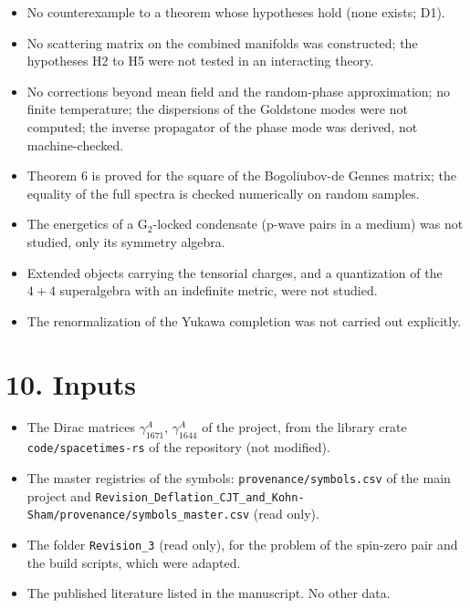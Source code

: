 \documentclass[
  10pt,
]{article}
\providecommand{\tightlist}{%
  \setlength{\itemsep}{0pt}\setlength{\parskip}{0pt}}
\begin{document}
\begin{itemize}
\tightlist
\item
  No counterexample to a theorem whose hypotheses hold (none exists;
  D1).
\item
  No scattering matrix on the combined manifolds was constructed; the
  hypotheses H2 to H5 were not tested in an interacting theory.
\item
  No corrections beyond mean field and the random-phase approximation;
  no finite temperature; the dispersions of the Goldstone modes were not
  computed; the inverse propagator of the phase mode was derived, not
  machine-checked.
\item
  Theorem 6 is proved for the square of the Bogoliubov-de Gennes matrix;
  the equality of the full spectra is checked numerically on random
  samples.
\item
  The energetics of a \(\mathrm G_2\)-locked condensate (p-wave pairs in
  a medium) was not studied, only its symmetry algebra.
\item
  Extended objects carrying the tensorial charges, and a quantization of
  the \(4+4\) superalgebra with an indefinite metric, were not studied.
\item
  The renormalization of the Yukawa completion was not carried out
  explicitly.
\end{itemize}

\hypertarget{inputs}{%
\section{10. Inputs}\label{inputs}}

\begin{itemize}
\tightlist
\item
  The Dirac matrices \(\gamma^A_{1671}\), \(\gamma^A_{1644}\) of the
  project, from the library crate \texttt{code/spacetimes-rs} of the
  repository (not modified).
\item
  The master registries of the symbols: \texttt{provenance/symbols.csv}
  of the main project and
  \texttt{Revision\_Deflation\_CJT\_and\_Kohn-Sham/provenance/symbols\_master.csv}
  (read only).
\item
  The folder \texttt{Revision\_3} (read only), for the problem of the
  spin-zero pair and the build scripts, which were adapted.
\item
  The published literature listed in the manuscript. No other data.
\end{itemize}
\end{document}
